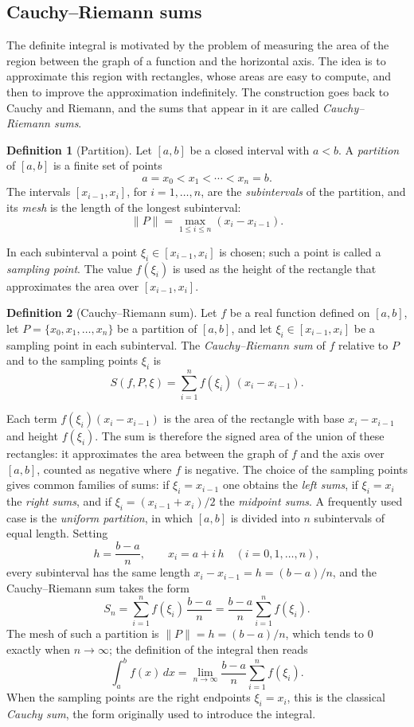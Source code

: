 \documentclass[11pt,a4paper]{article}
\theoremstyle{definition} \newtheorem{definition}{Definition} \theoremstyle{plain} \newtheorem{theorem}{Theorem}
\begin{document}
\subsection{Cauchy--Riemann sums}
The definite integral is motivated by the problem of measuring the area of the region between the graph of a function and the horizontal axis.
The idea is to approximate this region with rectangles, whose areas are easy to compute, and then to improve the approximation indefinitely.
The construction goes back to Cauchy and Riemann, and the sums that appear in it are called \emph{Cauchy--Riemann sums}.
\begin{definition}[Partition] Let $[a,b]$ be a closed interval with $a<b$.
A \emph{partition} of $[a,b]$ is a finite set of points \[ a = x_0 < x_1 < \cdots < x_n = b. \] The intervals $[x_{i-1},x_i]$, for $i=1,\ldots,n$, are the \emph{subintervals} of the partition, and its \emph{mesh} is the length of the longest subinterval: \[ \|P\| = \max_{1\le i\le n} (x_i-x_{i-1}). \] \end{definition}
In each subinterval a point $\xi_i\in [x_{i-1},x_i]$ is chosen; such a point is called a \emph{sampling point}.
The value $f(\xi_i)$ is used as the height of the rectangle that approximates the area over $[x_{i-1},x_i]$.
\begin{definition}[Cauchy--Riemann sum] Let $f$ be a real function defined on $[a,b]$, let $P=\{x_0,x_1,\ldots,x_n\}$ be a partition of $[a,b]$, and let $\xi_i\in [x_{i-1},x_i]$ be a sampling point in each subinterval.
The \emph{Cauchy--Riemann sum} of $f$ relative to $P$ and to the sampling points $\xi_i$ is \[ S(f,P,\xi) = \sum_{i=1}^{n} f(\xi_i)\,(x_i-x_{i-1}). \] \end{definition}
Each term $f(\xi_i)(x_i-x_{i-1})$ is the area of the rectangle with base $x_i-x_{i-1}$ and height $f(\xi_i)$.
The sum is therefore the signed area of the union of these rectangles: it approximates the area between the graph of $f$ and the axis over $[a,b]$, counted as negative where $f$ is negative.
The choice of the sampling points gives common families of sums: if $\xi_i=x_{i-1}$ one obtains the \emph{left sums}, if $\xi_i=x_i$ the \emph{right sums}, and if $\xi_i=(x_{i-1}+x_i)/2$ the \emph{midpoint sums}.
A frequently used case is the \emph{uniform partition}, in which $[a,b]$ is divided into $n$ subintervals of equal length.
Setting \[ h = \frac{b-a}{n}, \qquad x_i = a + i\,h \quad (i=0,1,\ldots,n), \] every subinterval has the same length $x_i-x_{i-1}=h=(b-a)/n$, and the Cauchy--Riemann sum takes the form \[ S_n = \sum_{i=1}^{n} f(\xi_i)\,\frac{b-a}{n}
= \frac{b-a}{n}\sum_{i=1}^{n} f(\xi_i). \] The mesh of such a partition is $\|P\|=h=(b-a)/n$, which tends to $0$ exactly when $n\to\infty$; the definition of the integral then reads \[ \int_a^b f(x)\,dx = \lim_{n\to\infty}\frac{b-a}{n}\sum_{i=1}^{n} f(\xi_i). \] When the sampling points are the right endpoints $\xi_i=x_i$, this is the classical \emph{Cauchy sum}, the form originally used to introduce the integral.
\end{document}
